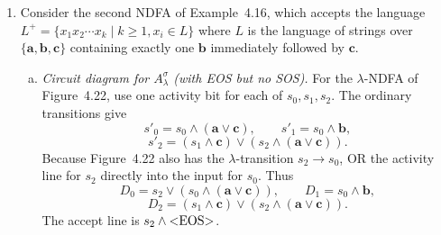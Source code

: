 \begin{enumerate}[{4.}1.]
\begin{enumerate}[(a)]
  \item \emph{Circuit diagram for the original $\lambda$-NDFA (no SOS/EOS).}
  Figure~4.19 uses four activity bits, one for each state.  Ignoring the
  $\lambda$-moves for a moment, the ordinary transitions give
  \[
    s'_0=0,\qquad
    s'_1=(s_0\wedge \pmb{a})\vee(s_3\wedge \pmb{b}),
  \]
  \[
    s'_2=(s_1\wedge \pmb{c})\vee(s_2\wedge \pmb{d}),\qquad
    s'_3=s_1\wedge \pmb{b}.
  \]
  Because a $\lambda$-move consumes no input symbol, whenever $s_0$ is active
  the next-state logic must also make $s_1$ active, and whenever $s_1$ is
  active it must also make $s_2$ active.  This is achieved by OR-ing the source
  activity line directly into the destination input.  Thus the circuit can be
  specified by
  \[
    D_0=0,\qquad
    D_1=s_0\vee(s_0\wedge \pmb{a})\vee(s_3\wedge \pmb{b}),
  \]
  \[
    D_2=s_1\vee(s_1\wedge \pmb{c})\vee(s_2\wedge \pmb{d}),\qquad
    D_3=s_1\wedge \pmb{b}.
  \]
  Initially only $s_0$ is active; the accept output is simply $s_2$.

  \item \emph{Circuit diagram for the NDFA from Definition~4.9 (part~(b) of
  Example~4.14, no SOS/EOS).}  The corresponding $\lambda$-free automaton is
  the one shown in Figure~4.20.  Use one activity bit for each of
  $q_0,s_0,s_1,s_2,s_3$; then
  \[
    q'_0=0,\qquad s'_0=0,
  \]
  \[
    s'_1=(s_0\wedge \pmb{a})\vee(s_3\wedge \pmb{b}),
  \]
  \[
    s'_2=(s_0\wedge \pmb{a})\vee(s_0\wedge \pmb{c})\vee(s_0\wedge \pmb{d})
       \vee(s_1\wedge \pmb{c})\vee(s_1\wedge \pmb{d})
       \vee(s_3\wedge \pmb{b})\vee(s_2\wedge \pmb{d}),
  \]
  \[
    s'_3=(s_0\wedge \pmb{b})\vee(s_1\wedge \pmb{b}).
  \]
  The initial activity bits are $q_0=s_0=1$ and $s_1=s_2=s_3=0$, and the
  accept output is $q_0\vee s_2$.
\end{enumerate}

\item Consider the second NDFA of Example~4.16, which accepts the language
$L^+=\{x_1 x_2\cdots x_k\mid k\ge 1,  x_i\in L\}$ where $L$ is the language
of strings over $\{\pmb{a},\pmb{b},\pmb{c}\}$ containing exactly one $\pmb{b}$
immediately followed by $\pmb{c}$.

\begin{enumerate}[(a)]
  \item \emph{Circuit diagram for $A^{\sigma}_\lambda$ (with EOS but no SOS).}
  For the $\lambda$-NDFA of Figure~4.22, use one activity bit for each of
  $s_0,s_1,s_2$.  The ordinary transitions give
  \[
    s'_0=s_0\wedge(\pmb{a}\vee\pmb{c}),\qquad
    s'_1=s_0\wedge \pmb{b},
  \]
  \[
    s'_2=(s_1\wedge \pmb{c})\vee(s_2\wedge(\pmb{a}\vee\pmb{c})).
  \]
  Because Figure~4.22 also has the $\lambda$-transition $s_2\to s_0$, OR the
  activity line for $s_2$ directly into the input for $s_0$.  Thus
  \[
    D_0=s_2\vee(s_0\wedge(\pmb{a}\vee\pmb{c})),\qquad
    D_1=s_0\wedge \pmb{b},
  \]
  \[
    D_2=(s_1\wedge \pmb{c})\vee(s_2\wedge(\pmb{a}\vee\pmb{c})).
  \]
  The accept line is $s_2\wedge\text{\text{\textless}EOS\text{\textgreater}}$.


\end{enumerate}
\end{enumerate}
